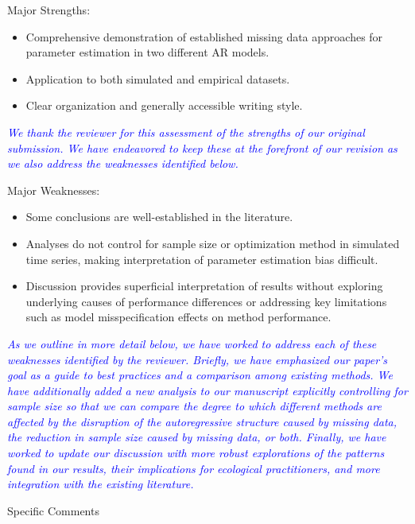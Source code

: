 \documentclass{article}
\begin{document}
\begin{linenumbers}
\bigskip

Major Strengths:
\begin{itemize}
    \item Comprehensive demonstration of established missing data approaches for parameter estimation in two different AR models.
    \item Application to both simulated and empirical datasets.
    \item Clear organization and generally accessible writing style.
\end{itemize}

\noindent \textcolor{blue}{\textit{We thank the reviewer for this assessment of the strengths of our original submission. We have endeavored to keep these at the forefront of our revision as we also address the weaknesses identified below.}} 

\bigskip

Major Weaknesses:
\begin{itemize}
    \item Some conclusions are well-established in the literature.
    \item Analyses do not control for sample size or optimization method in simulated time series, making interpretation of parameter estimation bias difficult.
    \item Discussion provides superficial interpretation of results without exploring underlying causes of performance differences or addressing key limitations such as model misspecification effects on method performance.
\end{itemize}

\noindent \textcolor{blue}{\textit{As we outline in more detail below, we have worked to address each of these weaknesses identified by the reviewer. Briefly, we have emphasized our paper's goal as a guide to best practices and a comparison among existing methods. We have additionally added a new analysis to our manuscript explicitly controlling for sample size so that we can compare the degree to which different methods are affected by the disruption of the autoregressive structure caused by missing data, the reduction in sample size caused by missing data, or both. Finally, we have worked to update our discussion with more robust explorations of the patterns found in our results, their implications for ecological practitioners, and more integration with the existing literature.}} 

\bigskip

Specific Comments


\end{linenumbers}
\end{document}
